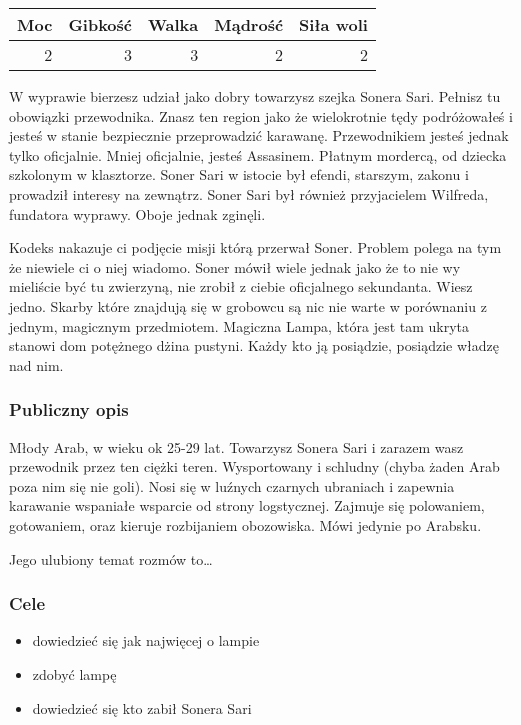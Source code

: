 \documentclass[11pt]{article}
\begin{document}
\begin{center}
\begin{tabular}{rrrrr}
 Moc  &  Gibkość  &  Walka  &  Mądrość  &  Siła woli  \\
\hline
   2  &        3  &      3  &        2  &          2  \\
\end{tabular}
\end{center}


    W wyprawie bierzesz udział jako dobry towarzysz szejka Sonera
    Sari. Pełnisz tu obowiązki przewodnika. Znasz ten region jako że
    wielokrotnie tędy podróżowałeś i jesteś w stanie bezpiecznie
    przeprowadzić karawanę. Przewodnikiem jesteś jednak tylko
    oficjalnie. Mniej oficjalnie, jesteś Assasinem. Płatnym mordercą, 
    od dziecka szkolonym w klasztorze. Soner Sari w istocie był
    efendi, starszym, zakonu i prowadził interesy na zewnątrz. Soner
    Sari był również przyjacielem Wilfreda, fundatora wyprawy. Oboje
    jednak zginęli.

    Kodeks nakazuje ci podjęcie misji którą przerwał Soner. Problem
    polega na tym że niewiele ci o niej wiadomo. Soner mówił wiele
    jednak jako że to nie wy mieliście być tu zwierzyną, nie zrobił z
    ciebie oficjalnego sekundanta. Wiesz jedno. Skarby które znajdują
    się w grobowcu są nic nie warte w porównaniu z jednym, magicznym
    przedmiotem. Magiczna Lampa, która jest tam ukryta stanowi dom
    potężnego dżina pustyni. Każdy kto ją posiądzie, posiądzie władzę
    nad nim.
\subsubsection*{Publiczny opis}
\label{sec-3.1.2}

    Młody Arab, w wieku ok 25-29 lat. Towarzysz Sonera Sari i zarazem
    wasz przewodnik przez ten ciężki teren. Wysportowany i schludny
    (chyba żaden Arab poza nim się nie goli). Nosi się w luźnych
    czarnych ubraniach i zapewnia karawanie wspaniałe wsparcie od
    strony logstycznej. Zajmuje się polowaniem, gotowaniem, oraz
    kieruje rozbijaniem obozowiska. Mówi jedynie po Arabsku.

    Jego ulubiony temat rozmów to\ldots{}
\subsubsection*{Cele}
\label{sec-3.1.3}

\begin{itemize}
\item dowiedzieć się jak najwięcej o lampie
\item zdobyć lampę
\item dowiedzieć się kto zabił Sonera Sari
\end{itemize}
\end{document}
